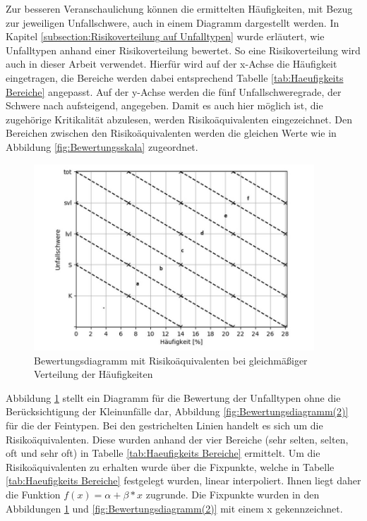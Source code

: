 Zur besseren Veranschaulichung können die ermittelten Häufigkeiten, mit Bezug zur jeweiligen Unfallschwere, auch in einem Diagramm dargestellt werden. In Kapitel \ref{subsection:Risikoverteilung auf Unfalltypen} wurde erläutert, wie \Textcite[S. 60]{Gschwendtner.2015} Unfalltypen anhand einer Risikoverteilung bewertet. So eine Risikoverteilung wird auch in dieser Arbeit verwendet. Hierfür wird auf der x-Achse die Häufigkeit eingetragen, die Bereiche werden dabei entsprechend Tabelle \ref{tab:Haeufigkeits Bereiche} angepasst. Auf der y-Achse werden die fünf Unfallschweregrade, der Schwere nach aufsteigend, angegeben. Damit es auch hier möglich ist, die zugehörige Kritikalität abzulesen, werden Risikoäquivalenten eingezeichnet. Den Bereichen zwischen den Risikoäquivalenten werden die gleichen Werte wie in Abbildung \ref{fig:Bewertungsskala} zugeordnet.

\begin{savenotes}
	\begin{figure}[H]
		\centering
		\includegraphics[width=10.5cm,height=7cm]{figures/Bewertungsdiagramm}
		\caption[Bewertungsdiagramm mit Risikoäquivalenten bei gleichmäßiger Verteilung der Häufigkeiten]{Bewertungsdiagramm mit Risikoäquivalenten bei gleichmäßiger Verteilung der Häufigkeiten}\label{fig:Bewertungsdiagramm}
	\end{figure}
\end{savenotes}

Abbildung \ref{fig:Bewertungsdiagramm} stellt ein Diagramm für die Bewertung der Unfalltypen ohne die Berücksichtigung der Kleinunfälle dar, Abbildung \ref{fig:Bewertungsdiagramm(2)} für die der Feintypen. Bei den gestrichelten Linien handelt es sich um die Risikoäquivalenten. Diese wurden anhand der vier Bereiche (sehr selten, selten, oft und sehr oft) in Tabelle \ref{tab:Haeufigkeits Bereiche} ermittelt. Um die Risikoäquivalenten zu erhalten wurde über die Fixpunkte, welche in Tabelle \ref{tab:Haeufigkeits Bereiche} festgelegt wurden, linear interpoliert. Ihnen liegt daher die Funktion $f(x) = \alpha + \beta*x$ zugrunde. Die Fixpunkte wurden in den Abbildungen \ref{fig:Bewertungsdiagramm} und \ref{fig:Bewertungsdiagramm(2)} mit einem x gekennzeichnet. 

